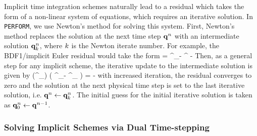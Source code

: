 Implicit time integration schemes naturally lead to a residual which takes the form of a non-linear system of equations, which requires an iterative solution. In \verb|PERFORM|, we use Newton's method for solving this system. First, Newton's method replaces the solution at the next time step $\mathbf{q}^{n}$ with an intermediate solution $\mathbf{q}^{n}_{k}$, where $k$ is the Newton iterate number. For example, the BDF1/implicit Euler residual would take the form
\be
    \resFunc{\consVec^{\timeIdx}_\newtonIdx} = \consVec^{\timeIdx}_\newtonIdx - \consVec^{} - \Delta \timeVar \rhsFunc{\consVec^{\timeIdx}_\newtonIdx}
\ee
Then, as a general step for any implicit scheme, the iterative update to the intermediate solution is given by
\be
    \pde{\resVec}{\consVec}(\consVec^{\timeIdx}_{}) \left( \consVec^{\timeIdx}_\newtonIdx - \consVec^{\timeIdx}_{} \right) = -
\ee
with increased iteration, the residual converges to zero and the solution at the next physical time step is set to the last iterative solution, i.e. $\mathbf{q}^{n} \leftarrow \mathbf{q}^{n}_{k}$. The initial guess for the initial iterative solution is taken as $\mathbf{q}^{n}_0 \leftarrow \mathbf{q}^{n-1}$. 

\subsubsection{Solving Implicit Schemes via Dual Time-stepping}

